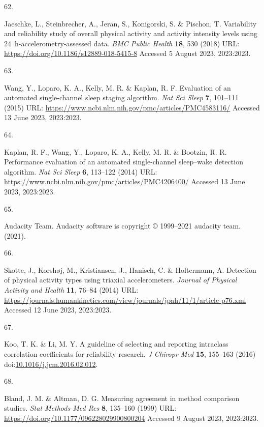 \documentclass[
  9pt,
]{scrbook}
\newlength{\cslhangindent}
\newlength{\csllabelwidth}
\newlength{\cslentryspacingunit} %
\newenvironment{CSLReferences}[2] %
 {%
  \setlength{\parindent}{0pt}
  \ifodd #1
  \let\oldpar\par
  \def\par{\hangindent=\cslhangindent\oldpar}
  \fi
  \setlength{\parskip}{#2\cslentryspacingunit}
 }%
 {}
\newcommand{\CSLLeftMargin}[1]{\parbox[t]{\csllabelwidth}{#1}}
\newcommand{\CSLRightInline}[1]{\parbox[t]{\linewidth - \csllabelwidth}{#1}\break}
\begin{document}
\begin{CSLReferences}{0}{0}
\leavevmode{}%
\CSLLeftMargin{62. }%
\CSLRightInline{Jaeschke, L., Steinbrecher, A., Jeran, S., Konigorski,
S. \& Pischon, T. Variability and reliability study of overall physical
activity and activity intensity levels using 24~h-accelerometry-assessed
data. \emph{{BMC} Public Health} \textbf{18}, 530 (2018) URL:
\url{https://doi.org/10.1186/s12889-018-5415-8} Accessed 5 August 2023,
2023:2023.}

\leavevmode{}%
\CSLLeftMargin{63. }%
\CSLRightInline{Wang, Y., Loparo, K. A., Kelly, M. R. \& Kaplan, R. F.
Evaluation of an automated single-channel sleep staging algorithm.
\emph{Nat Sci Sleep} \textbf{7}, 101--111 (2015) URL:
\url{https://www.ncbi.nlm.nih.gov/pmc/articles/PMC4583116/} Accessed 13
June 2023, 2023:2023.}

\leavevmode{}%
\CSLLeftMargin{64. }%
\CSLRightInline{Kaplan, R. F., Wang, Y., Loparo, K. A., Kelly, M. R. \&
Bootzin, R. R. Performance evaluation of an automated single-channel
sleep--wake detection algorithm. \emph{Nat Sci Sleep} \textbf{6},
113--122 (2014) URL:
\url{https://www.ncbi.nlm.nih.gov/pmc/articles/PMC4206400/} Accessed 13
June 2023, 2023:2023.}

\leavevmode{}%
\CSLLeftMargin{65. }%
\CSLRightInline{Audacity Team. Audacity\textregistered{} software is
copyright © 1999--2021 audacity team. (2021).}

\leavevmode{}%
\CSLLeftMargin{66. }%
\CSLRightInline{Skotte, J., Korshøj, M., Kristiansen, J., Hanisch, C. \&
Holtermann, A. Detection of physical activity types using triaxial
accelerometers. \emph{Journal of Physical Activity and Health}
\textbf{11}, 76--84 (2014) URL:
\url{https://journals.humankinetics.com/view/journals/jpah/11/1/article-p76.xml}
Accessed 12 June 2023, 2023:2023.}

\leavevmode{}%
\CSLLeftMargin{67. }%
\CSLRightInline{Koo, T. K. \& Li, M. Y. A guideline of selecting and
reporting intraclass correlation coefficients for reliability research.
\emph{J Chiropr Med} \textbf{15}, 155--163 (2016)
doi:\href{https://doi.org/10.1016/j.jcm.2016.02.012}{10.1016/j.jcm.2016.02.012}.}

\leavevmode{}%
\CSLLeftMargin{68. }%
\CSLRightInline{Bland, J. M. \& Altman, D. G. Measuring agreement in
method comparison studies. \emph{Stat Methods Med Res} \textbf{8},
135--160 (1999) URL: \url{https://doi.org/10.1177/096228029900800204}
Accessed 9 August 2023, 2023:2023.}


\end{CSLReferences}
\end{document}
